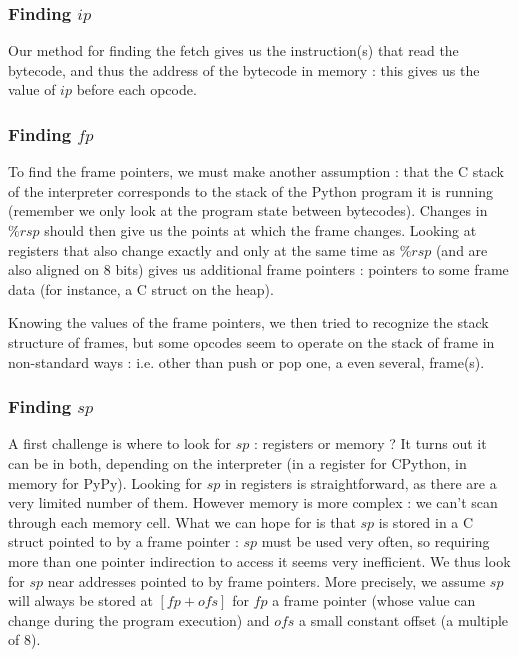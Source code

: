 \documentclass[french]{article}
\begin{document}
\subsubsection{Finding $ip$}

Our method for finding the fetch gives us the instruction(s) that read the bytecode, and thus the address of the bytecode in memory : this gives us the value of $ip$ before each opcode.

\subsubsection{Finding $fp$}

To find the frame pointers, we must make another assumption : that the C stack of the interpreter corresponds to the stack of the Python program it is running (remember we only look at the program state between bytecodes). Changes in $\%rsp$ should then give us the points at which the frame changes. Looking at registers that also change exactly and only at the same time as $\%rsp$ (and are also aligned on 8 bits) gives us additional frame pointers : pointers to some frame data (for instance, a C struct on the heap).

Knowing the values of the frame pointers, we then tried to recognize the stack structure of frames, but some opcodes seem to operate on the stack of frame in non-standard ways : i.e. other than push or pop one, a even several, frame(s).

\subsubsection{Finding $sp$}

A first challenge is where to look for $sp$ : registers or memory ? It turns out it can be in both, depending on the interpreter (in a register for CPython, in memory for PyPy). Looking for $sp$ in registers is straightforward, as there are a very limited number of them. However memory is more complex : we can't scan through each memory cell. What we can hope for is that $sp$ is stored in a C struct pointed to by a frame pointer : $sp$ must be used very often, so requiring more than one pointer indirection to access it seems very inefficient. We thus look for $sp$ near addresses pointed to by frame pointers.  More precisely, we assume $sp$ will always be stored at $[fp + ofs]$ for $fp$ a frame pointer (whose value can change during the program execution) and $ofs$ a small constant offset (a multiple of 8).
\end{document}
